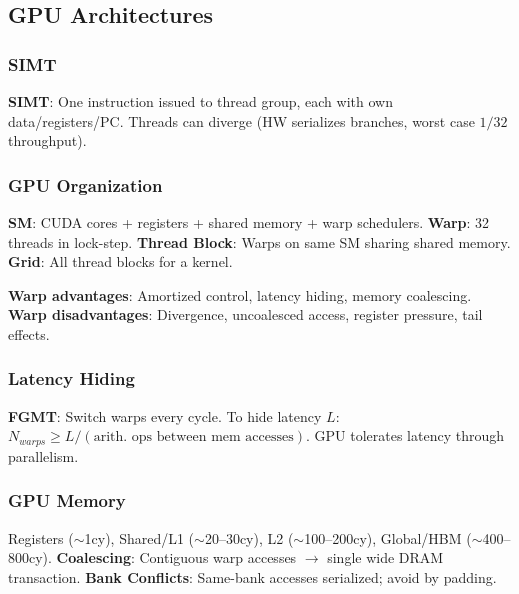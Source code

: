 \subsection{GPU Architectures}

\subsubsection{SIMT}

\begin{definition}
	\textbf{SIMT}: One instruction issued to thread group, each with own data/registers/PC. Threads can diverge (HW serializes branches, worst case $1/32$ throughput).
\end{definition}

\subsubsection{GPU Organization}

\begin{definition}
	\textbf{SM}: CUDA cores + registers + shared memory + warp schedulers.
	\textbf{Warp}: 32 threads in lock-step.
	\textbf{Thread Block}: Warps on same SM sharing shared memory.
	\textbf{Grid}: All thread blocks for a kernel.
\end{definition}

\begin{theorem}
	\textbf{Warp advantages}: Amortized control, latency hiding, memory coalescing.
	\textbf{Warp disadvantages}: Divergence, uncoalesced access, register pressure, tail effects.
\end{theorem}

\subsubsection{Latency Hiding}

\begin{definition}
	\textbf{FGMT}: Switch warps every cycle. To hide latency $L$: $N_{warps} \geq L / (\text{arith. ops between mem accesses})$. GPU tolerates latency through parallelism.
\end{definition}

\subsubsection{GPU Memory}

\begin{remark}
	Registers ($\sim$1cy), Shared/L1 ($\sim$20--30cy), L2 ($\sim$100--200cy), Global/HBM ($\sim$400--800cy).
	\textbf{Coalescing}: Contiguous warp accesses $\to$ single wide DRAM transaction.
	\textbf{Bank Conflicts}: Same-bank accesses serialized; avoid by padding.
\end{remark}
